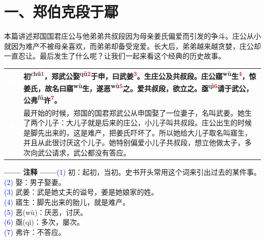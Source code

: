 \documentclass[a4paper,12pt]{ctexart}
\makeatletter
\newcommand{\ruby}[2]{#1\textsuperscript{#2}}
\newlength{\colA}\setlength{\colA}{0.06\textwidth}
\newlength{\colB}\setlength{\colB}{0.64\textwidth}
\newlength{\colC}\setlength{\colC}{0.26\textwidth}
\newcommand{\sectab}[3]{%
  \noindent
  \begin{minipage}[c]{\dimexpr\colA+\colB+2\tabcolsep\relax}
  \begin{tabular}{@{}p{\colA}p{\colB}@{}}
  \sideyuan  & {\large\bfseries #1} \\
  \sideyiwen & {\large #2} \\
  \end{tabular}
  \end{minipage}
  \hfill
  \begin{minipage}[c]{\colC}
  {\labelann\vspace{0.1cm}}#3
  \end{minipage}
  \par
}
\newcommand{\sideyuan}{\colorbox{blue!70!black}{\textcolor{white}{\normalsize\textbf{原文}}}}
\newcommand{\sideyiwen}{\colorbox{green!60!black}{\textcolor{white}{\normalsize\textbf{译文}}}}
\newcommand{\labelann}{\textcolor{orange!80!black}{\small\textbf{—— 注释 ——}}}
\newcommand{\refmark}[1]{\textsuperscript{\textcolor{red}{#1}}}
\makeatother
\begin{document}
\newpage

\section*{\textcolor{orange!80!black}{一、郑伯克段于鄢}}

本篇讲述郑国国君庄公与他弟弟共叔段因为母亲姜氏偏爱而引发的争斗。庄公从小就因为难产不被母亲喜欢，而弟弟却备受宠爱。长大后，弟弟越来越贪婪，庄公却一直忍让。最后发生了什么呢？让我们一起来看这个经典的历史故事。

\vspace{0.3cm}
\sectab{\ruby{初}{chū}\refmark{1}，郑武公\ruby{娶}{qǔ}\refmark{2}于申，曰武姜\refmark{3}。生庄公及共叔段。庄公\ruby{寤}{wù}生\refmark{4}，惊姜氏，故名曰\ruby{寤}{wù}生，遂\ruby{恶}{wù}\refmark{5}之。爱共叔段，欲立之。\ruby{亟}{qì}\refmark{6}请于武公，公\ruby{弗}{fú}许\refmark{7}。}{最开始的时候，郑国的国君郑武公从申国娶了一位妻子，名叫武姜。她生了两个儿子：大儿子就是后来的庄公，小儿子叫共叔段。庄公出生的时候是脚先出来的，这是难产，把姜氏吓坏了。所以她给大儿子取名叫寤生，并且从此很讨厌这个儿子。她特别偏爱小儿子共叔段，想立他做太子，多次向武公请求，武公都没有答应。}{{\small \textcolor{blue}{(1)} 初：起初，当初。史书开头常用这个词来引出过去的某件事。}\\[0.1cm]{\small \textcolor{blue}{(2)} 娶：男子娶妻。}\\[0.1cm]{\small \textcolor{blue}{(3)} 武姜：武是她丈夫的谥号，姜是她娘家的姓。}\\[0.1cm]{\small \textcolor{blue}{(4)} 寤生：脚先出来的胎儿，就是难产。}\\[0.1cm]{\small \textcolor{blue}{(5)} 恶(wù)：厌恶，讨厌。}\\[0.1cm]{\small \textcolor{blue}{(6)} 亟(qì)：多次，屡次。}\\[0.1cm]{\small \textcolor{blue}{(7)} 弗许：不答应。}}
\end{document}
